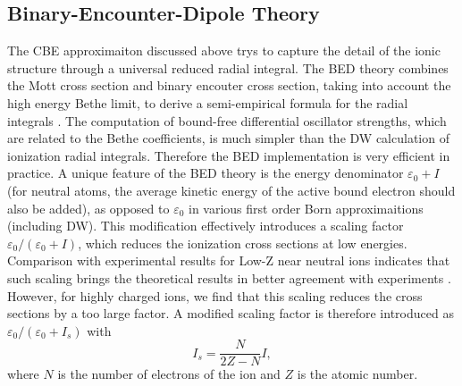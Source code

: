 \documentclass[preprint, floatfix, pra, showpacs, showkeys]{revtex4}
\begin{document}
\subsection{Binary-Encounter-Dipole Theory}
The CBE approximaiton discussed above trys to capture the detail of the ionic
structure through a universal reduced radial integral. The BED theory
combines the Mott cross section and binary encouter cross section, taking into
account the high energy Bethe limit, to derive a semi-empirical formula for
the radial integrals \cite{kim94}. The computation of bound-free differential
oscillator strengths, which are related to the Bethe coefficients, is much
simpler than the DW calculation of ionization radial integrals. Therefore the
BED implementation is very efficient in practice. A unique feature of the BED
theory is the energy denominator $\varepsilon_0+I$ (for neutral atoms, the
average kinetic energy of the active bound electron should also be added), as
opposed to $\varepsilon_0$ in various first order Born approximaitions
(including DW). This modification effectively introduces a scaling factor
$\varepsilon_0/(\varepsilon_0+I)$, which reduces the ionization cross sections
at low energies. Comparison with experimental results for Low-Z near neutral
ions indicates that such scaling brings the theoretical results in better
agreement with experiments \cite{kim94}. However, for highly charged ions, we
find that this scaling reduces the cross sections by a too large factor. A
modified scaling factor is therefore introduced as
$\varepsilon_0/(\varepsilon_0+I_s)$ with
\begin{equation}
I_s = \frac{N}{2Z-N}I,
\end{equation}
where $N$ is the number of electrons of the ion and $Z$ is the atomic
number.
\end{document}
